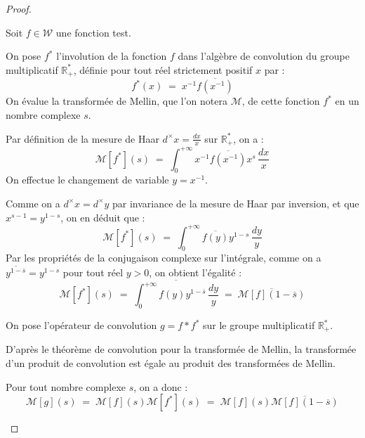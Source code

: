 \documentclass[Riemann_Hypothesis.tex]{subfiles}
\begin{document}
\begin{proof}
    \begin{part_proof}
        Soit $f \in \mathcal{W}$ une fonction test. \par
        On pose $f^*$ l'involution de la fonction $f$ dans l'algèbre de convolution du groupe multiplicatif $\mathbb{R}_+^*$, définie pour tout réel strictement positif $x$ par :
        \begin{equation*}
            f^*(x) \;=\; x^{-1} \overline{f\left(x^{-1}\right)}
        \end{equation*}
        On évalue la transformée de Mellin, que l'on notera $\mathcal{M}$, de cette fonction $f^*$ en un nombre complexe $s$. \par
        Par définition de la mesure de Haar $d^\times x = \frac{dx}{x}$ sur $\mathbb{R}_+^*$, on a :
        \begin{equation*}
            \mathcal{M}[f^*](s) \;=\; \int_{0}^{+\infty} x^{-1} \overline{f\left(x^{-1}\right)} x^s \, \frac{dx}{x}
        \end{equation*}
        On effectue le changement de variable $y = x^{-1}$. \par
        Comme on a $d^\times x = d^\times y$ par invariance de la mesure de Haar par inversion, et que $x^{s-1} = y^{1-s}$, on en déduit que :
        \begin{equation*}
            \mathcal{M}[f^*](s) \;=\; \int_{0}^{+\infty} \overline{f(y)} y^{1-s} \, \frac{dy}{y}
        \end{equation*}
        Par les propriétés de la conjugaison complexe sur l'intégrale, comme on a $\overline{y^{1-\overline{s}}} = y^{1-s}$ pour tout réel $y > 0$, on obtient l'égalité :
        \begin{equation*}
            \mathcal{M}[f^*](s) \;=\; \overline{ \int_{0}^{+\infty} f(y) y^{1-\overline{s}} \, \frac{dy}{y} } \;=\; \overline{\mathcal{M}[f](1-\overline{s})}
        \end{equation*}
    \end{part_proof}
    \begin{part_proof}
        On pose l'opérateur de convolution $g = f * f^*$ sur le groupe multiplicatif $\mathbb{R}_+^*$. \par
        D'après le théorème de convolution pour la transformée de Mellin, la transformée d'un produit de convolution est égale au produit des transformées de Mellin. \par
        Pour tout nombre complexe $s$, on a donc :
        \begin{equation*}
            \mathcal{M}[g](s) \;=\; \mathcal{M}[f](s) \mathcal{M}[f^*](s) \;=\; \mathcal{M}[f](s) \overline{\mathcal{M}[f](1-\overline{s})}

\end{equation*}
\end{part_proof}
\end{proof}
\end{document}
